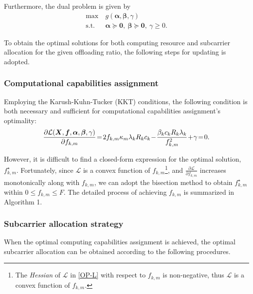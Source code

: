 \documentclass[journal]{IEEEtran}
\begin{document}
    Furthermore, the dual problem is given by
    \begin{equation}
        \label{OP-DP}
        \begin{aligned}
            \max ~&g(\boldsymbol\alpha,\boldsymbol\beta,\gamma)\\
            \mathrm{s.t.} ~&\boldsymbol{\alpha}\succeq \boldsymbol{0},~\boldsymbol{\beta}\succeq \boldsymbol{0},~\gamma \geq 0.
        \end{aligned}
    \end{equation}

    To obtain the optimal solutions for both computing resource and subcarrier allocation for the given offloading ratio, the following steps for updating is adopted.
    \subsubsection{Computational capabilities assignment}
    Employing the Karush-Kuhn-Tucker (KKT) conditions, the following condition is both necessary and sufficient for computational capabilities assignment's optimality:
    \begin{equation}{\label{op-f}}
        \begin{aligned}
            \frac{\partial\mathcal{L}(\boldsymbol{X},\boldsymbol{f},\boldsymbol\alpha,\boldsymbol\beta,\gamma)}{\partial{f_{k,m}}}\!=\! 2f_{k,m}\kappa_m\lambda_{k}R_{k}c_{k}
            \!-\!\frac{\beta_{k}c_{k}R_{k}\lambda_{k}}{f_{k,m}^2}\!+\!\gamma\! =\! 0.
        \end{aligned}
    \end{equation}

    However, it is difficult to find a closed-form expression for the optimal solution, $f_{k,m}^\star$. Fortunately, since $\mathcal{L}$ is a convex function of $f_{k,m}$\footnote{The \emph{Hessian} of $\mathcal{L}$ in \eqref{OP-L} with respect to $f_{k,m}$ is non-negative, thus $\mathcal{L}$ is a convex function of $f_{k,m}$\cite{boyd2004convex}.}, and $\frac{\partial\mathcal{L}}{\partial{f_{k,m}}}$ increases monotonically along with $f_{k,m}$, we can adopt the bisection method to obtain $f_{k,m}^\star$ within $0\leq f_{k,m}\leq F$. The detailed process of achieving $f_{k,m}$ is summarized in Algorithm 1.
    
    \subsubsection{Subcarrier allocation strategy}
    When the optimal computing capabilities assignment is achieved, the optimal subcarrier allocation can be obtained according to the following procedures.
\end{document}
